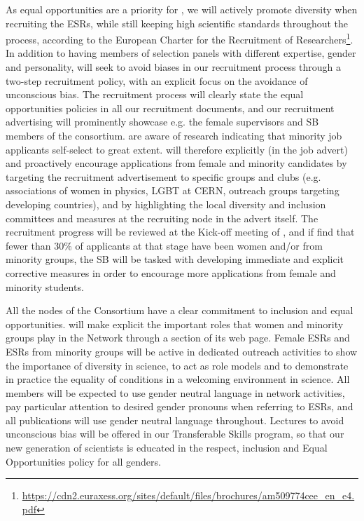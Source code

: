 As equal opportunities are a priority for \acronym, we will
actively promote diversity when recruiting the ESRs, while still keeping high scientific
standards throughout the process, according to the European Charter for the Recruitment of Researchers\footnote{
\url{https://cdn2.euraxess.org/sites/default/files/brochures/am509774cee_en_e4.pdf}}. 
In addition to having members of selection panels with
different expertise, gender and personality, \acronym will seek to avoid
biases in our recruitment process through a two-step recruitment policy, with
an explicit focus on the avoidance of unconscious bias.
The \acronym recruitment process will clearly state
the equal opportunities policies in all our recruitment documents,
and our recruitment advertising will prominently
showcase e.g. the female supervisors and SB members of the consortium. 
\acronym are aware of research indicating that minority job applicants
self-select to great extent. \acronym will therefore explicitly (in the job advert)
and proactively encourage applications from female 
and minority candidates by targeting the recruitment advertisement
to specific groups and clubs (e.g. associations of women in physics, 
LGBT at CERN, outreach groups targeting developing countries),
and by highlighting the local diversity and inclusion committees and measures
at the recruiting node in the advert itself. 
The recruitment progress will be reviewed at the
Kick-off meeting of \acronym, and if \acronym find that fewer
than 30\% of applicants at that stage have been women
and/or from minority groups, the SB will be tasked with developing
immediate and explicit corrective measures in order
to encourage more applications from female and minority students.  

All the nodes of the Consortium have a clear commitment to
inclusion and equal opportunities. \acronym will make explicit the
important roles that women and minority groups play in the Network through a section of its web page. 
Female ESRs and ESRs from minority groups will be active in dedicated outreach
activities to show the importance of diversity in science, to act as role models and to demonstrate
in practice the equality of conditions in a welcoming environment in science. 
All \acronym members will be expected to use gender neutral language
in network activities, pay particular attention to desired gender pronouns when referring to ESRs, 
and all \acronym publications will use gender neutral language throughout.
Lectures to avoid unconscious bias will be offered in our Transferable Skills program,
so that our new generation of scientists is educated in the respect, inclusion and
Equal Opportunities policy for all genders.


